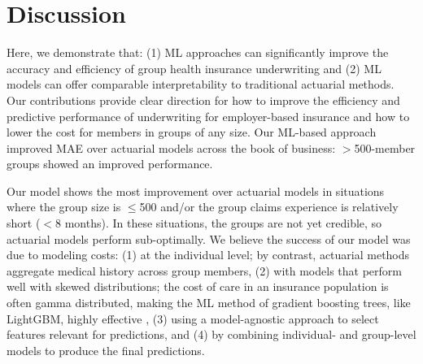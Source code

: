 \documentclass[letterpaper]{article}
\begin{document}
\section*{Discussion}
Here, we demonstrate that: (1) ML approaches can significantly improve the accuracy and efficiency of group health insurance underwriting and (2) ML models can offer comparable interpretability to traditional actuarial methods. Our contributions provide clear direction for how to improve the efficiency and predictive performance of underwriting for employer-based insurance and how to lower the cost for members in groups of any size. Our ML-based approach improved MAE over actuarial models across the book of business: $>$500-member groups showed an improved performance.

Our model shows the most improvement over actuarial models in situations where the group size is $\leq$500 and/or the group claims experience is relatively short ($<$8 months).  In these situations, the groups are not yet credible, so actuarial models perform sub-optimally. We believe the success of our model was due to modeling costs: (1) at the individual level; by contrast, actuarial methods aggregate medical history across group members, (2) with models that perform well with skewed distributions; the cost of care in an insurance population is often gamma distributed, making the ML method of gradient boosting trees, like LightGBM, highly effective \cite{gradboost}, (3) using a model-agnostic approach to select features relevant for predictions, and (4) by combining individual- and group-level models to produce the final predictions.
\end{document}
